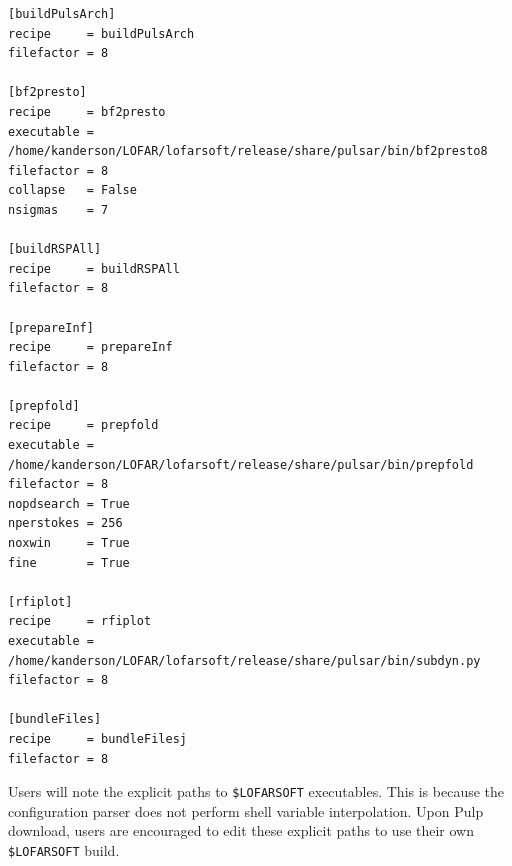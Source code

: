 \documentclass[a4paper,10pt,bibtotoc]{scrartcl}
\begin{document}
\begin{verbatim}
[buildPulsArch]
recipe     = buildPulsArch
filefactor = 8

[bf2presto]
recipe     = bf2presto
executable = /home/kanderson/LOFAR/lofarsoft/release/share/pulsar/bin/bf2presto8
filefactor = 8
collapse   = False
nsigmas    = 7

[buildRSPAll]
recipe     = buildRSPAll
filefactor = 8

[prepareInf]
recipe     = prepareInf
filefactor = 8

[prepfold]
recipe     = prepfold
executable = /home/kanderson/LOFAR/lofarsoft/release/share/pulsar/bin/prepfold
filefactor = 8
nopdsearch = True
nperstokes = 256
noxwin     = True
fine       = True

[rfiplot]
recipe     = rfiplot
executable = /home/kanderson/LOFAR/lofarsoft/release/share/pulsar/bin/subdyn.py
filefactor = 8

[bundleFiles]
recipe     = bundleFilesj
filefactor = 8
\end{verbatim}
Users will note the explicit paths to \verb|$LOFARSOFT| executables.  This is because the configuration parser does not perform shell variable interpolation.   Upon Pulp download, users are encouraged to edit these explicit paths to use their own \verb|$LOFARSOFT| build.
\
\end{document}
